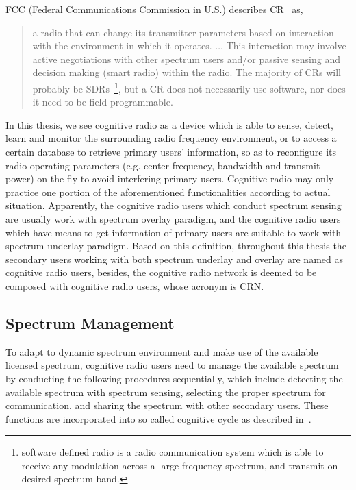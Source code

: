 FCC (Federal Communications Commission in U.S.) describes CR~\cite{FCC_03-322} as,
\blockquote{
a radio that can change its transmitter parameters based on interaction with the environment in which it operates. $\ldots$
This interaction may involve active negotiations with other spectrum users and/or passive sensing and decision making (smart radio) within the radio. The majority of CRs will probably be SDRs~\footnote{software defined radio is a radio communication system which is able to receive any modulation across a large frequency spectrum, and transmit on desired spectrum band.}, but a CR does not necessarily use software, nor does it need to be field programmable.
}

In this thesis, we see cognitive radio as a device which is able to sense, detect, learn and monitor the surrounding radio frequency environment, or to access a certain database to retrieve primary users' information, so as to reconfigure its radio operating parameters (e.g. center frequency, bandwidth and transmit power) on the fly to avoid interfering primary users.
Cognitive radio may only practice one portion of the aforementioned functionalities according to actual situation.
Apparently, the cognitive radio users which conduct spectrum sensing are usually work with spectrum overlay paradigm, and the cognitive radio users which have means to get information of primary users are suitable to work with spectrum underlay paradigm.
Based on this definition, throughout this thesis the secondary users working with both spectrum underlay and overlay are named as cognitive radio users, besides, the cognitive radio network is deemed to be composed with cognitive radio users, whose acronym is CRN.



\subsection{Spectrum Management}
To adapt to dynamic spectrum environment and make use of the available licensed spectrum, cognitive radio users need to manage the available spectrum by conducting the following procedures sequentially, which include detecting the available spectrum with spectrum sensing, selecting the proper spectrum for communication, and sharing the spectrum with other secondary users.
These functions are incorporated into so called cognitive cycle as described in~\cite{Akyildiz09}.

